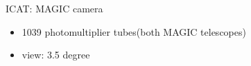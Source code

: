 \documentclass{beamer}
\begin{document}
\begin{frame}{ICAT: MAGIC camera}
    \begin{itemize}
        \item 1039 photomultiplier tubes(both MAGIC telescopes)
        \item view: 3.5 degree
    \end{itemize}

    \begin{figure}
        \centering
        \qquad
    \end{figure}
\end{frame}
\end{document}
